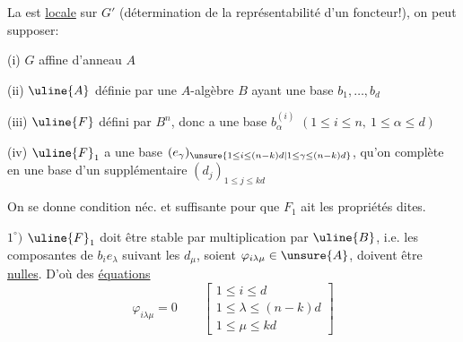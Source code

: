 La   est \uline{locale} sur $G'$ (détermination de la représentabilité d'un foncteur!), on peut supposer: 

(i) $G$ affine d'anneau $A$

(ii) $\uline{A}$ définie par une $A$-algèbre $B$ ayant une base $b_1,\ldots,b_d$

(iii) $\uline{F}$ défini par $B^n$, donc a une base $b_\alpha^{(i)}$ $(1\leq i\leq n,\ 1\leq\alpha\leq d)$

(iv) $\uline{F}_1$ a une base  $(e_\gamma)_{\unsure{1\leq i\leq(n-k)d|1\leq\gamma\leq(n-k)d}}$, qu'on complète en une base d'un supplémentaire $(d_j)_{1\leq j\leq kd}$

On se donne   condition néc. et suffisante
pour que $F_1$ ait les propriétés dites. 

$1^\circ)$ $\uline{F}_1$ doit être stable par multiplication par $\uline{B}$, i.e.  les composantes de $b_i e_\lambda$ suivant les $d_\mu$, soient $\varphi_{i\lambda\mu}\in\unsure{A}$, doivent être \uline{nulles}. D'où des \uline{équations}
\[
\varphi_{i\lambda\mu}=0\qquad\left[\begin{array}{l}
1\leq i\leq d\\
1\leq\lambda\leq(n-k)d\\
1\leq\mu\leq kd
\end{array}\right]
\]

